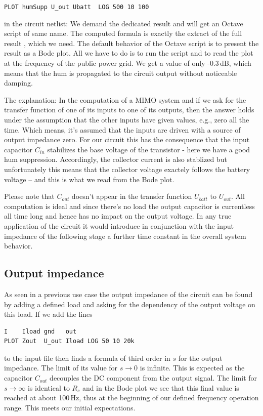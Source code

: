 \verb+PLOT humSupp U_out Ubatt  LOG 500 10 100+

in the circuit netlist: We demand the dedicated result  and
will get an Octave script of same name. The computed formula is exactly
the extract of the full result , which we need. The default
behavior of the Octave script is to present the result as
a Bode plot. All we have to do is to run the script and to read the plot
at the frequency of the public power grid. We get a value of only
-0.3\,dB, which means that the hum is propagated to the circuit output
without noticeable damping.

The explanation: In the computation of a MIMO system and if we ask for the
transfer function of one of its inputs to one of its outputs, then the
answer holds under the assumption that the other inputs have given values,
e.g., zero all the time. Which means, it's assumed that the inputs are
driven with a source of output impedance zero. For our circuit this has
the consequence that the input capacitor $C_{in}$ stabilizes the base
voltage of the transistor - here we have a good hum suppression.
Accordingly, the collector current is also stablized but unfortunately
this means that the collector voltage exactely follows the battery voltage
-- and this is what we read from the Bode plot.

Please note that $C_{out}$ doesn't appear in the transfer function
$U_{batt}$ to $U_{out}$. All computation is ideal and since there's no
load the output capacitor is currentless all time long and hence has no
impact on the output voltage. In any true application of the circuit it
would introduce in conjunction with the input impedance of the following
stage a further time constant in the overall system behavior.


\subsection{Output impedance}

As seen in a previous use case the output impedance of the circuit can be
found by adding a defined load and asking for the dependency of the output
voltage on this load. If we add the lines
\begin{verbatim}
I    Iload gnd   out   
PLOT Zout  U_out Iload LOG 50 10 20k
\end{verbatim}
to the input file then \linnet{} finds a formula of third order in $s$ for
the output impedance. The limit of its value for $s \to 0$ is infinite.
This is expected as the capacitor $C_{out}$ decouples the DC component
from the output signal. The limit for $s \to \infty$ is identical to $R_c$
and in the Bode plot we see that this final value is reached at about
100\,Hz, thus at the beginning of our defined frequency operation range.
This meets our initial expectations.

